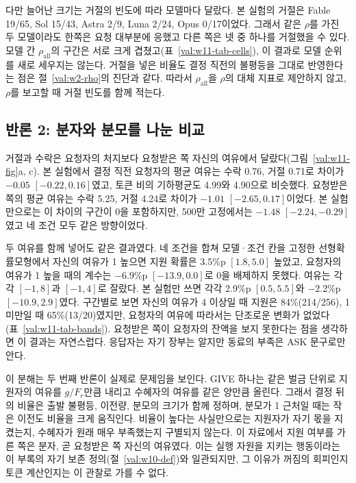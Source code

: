 다만 늘어난 크기는 거절의 빈도에 따라 모델마다 달랐다. 본 실험의 거절은 Fable 19/65, Sol 15/43, Astra 2/9, Luna 2/24, Opus 0/17이었다. 그래서 같은 $\rho$를 가진 두 모델이라도 한쪽은 요청 대부분에 응했고 다른 쪽은 넷 중 하나를 거절했을 수 있다. 모델 간 $\rho_{\mathrm{all}}$의 구간은 서로 크게 겹쳤고(표~\ref{val:w11-tab-cells}), 이 결과로 모델 순위를 새로 세우지는 않는다. 거절을 넣은 비율도 결정 직전의 불평등을 그대로 반영한다는 점은 절~\ref{val:w2-rho}의 진단과 같다. 따라서 $\rho_{\mathrm{all}}$을 $\rho$의 대체 지표로 제안하지 않고, $\rho$를 보고할 때 거절 빈도를 함께 적는다.

\subsection{반론 2: 분자와 분모를 나눈 비교}\label{val:w11-split}

거절과 수락은 요청자의 처지보다 요청받은 쪽 자신의 여유에서 달랐다(그림~\ref{val:w11-fig}a, c). 본 실험에서 결정 직전 요청자의 평균 여유는 수락 0.76, 거절 0.71로 차이가 $-0.05$ $[-0.22, 0.16]$였고, 토큰 비의 기하평균도 4.99와 4.90으로 비슷했다. 요청받은 쪽의 평균 여유는 수락 5.25, 거절 4.24로 차이가 $-1.01$ $[-2.65, 0.17]$이었다. 본 실험만으로는 이 차이의 구간이 0을 포함하지만, 500만 고정에서는 $-1.48$ $[-2.24, -0.29]$였고 네 조건 모두 같은 방향이었다.

\begin{table}[H]
\centering
\caption{결정 직전 여유 구간별 라운드 안 GIVE 비율. 위는 요청받은 쪽 자신의 여유 $L_s$, 아래는 요청한 쪽의 여유 $L_t$로 나눈 것이다. 표본은 표~\ref{val:w11-tab-cells}의 결정(본 실험 158건, 네 조건 471건)이다.}
\label{val:w11-tab-bands}
\small

\end{table}

두 여유를 함께 넣어도 같은 결과였다. 네 조건을 합쳐 모델·조건 칸을 고정한 선형확률모형에서 자신의 여유가 1 높으면 지원 확률은 3.5\%p $[1.8, 5.0]$ 높았고, 요청자의 여유가 1 높을 때의 계수는 $-6.9$\%p $[-13.9, 0.0]$로 0을 배제하지 못했다. 여유는 각각 $[-1, 8]$과 $[-1, 4]$로 잘랐다. 본 실험만 쓰면 각각 2.9\%p $[0.5, 5.5]$와 $-2.2$\%p $[-10.9, 2.9]$였다. 구간별로 보면 자신의 여유가 4 이상일 때 지원은 84\%(214/256), 1 미만일 때 65\%(13/20)였지만, 요청자의 여유에 따라서는 단조로운 변화가 없었다(표~\ref{val:w11-tab-bands}). 요청받은 쪽이 요청자의 잔액을 보지 못한다는 점을 생각하면 이 결과는 자연스럽다. 응답자는 자기 장부는 알지만 동료의 부족은 ASK 문구로만 안다.

이 분해는 두 번째 반론이 실제로 문제임을 보인다. GIVE 하나는 같은 벌금 단위로 지원자의 여유를 $g/F_r$만큼 내리고 수혜자의 여유를 같은 양만큼 올린다. 그래서 결정 뒤의 비율은 출발 불평등, 이전량, 분모의 크기가 함께 정하며, 분모가 1 근처일 때는 작은 이전도 비율을 크게 움직인다. 비율이 높다는 사실만으로는 지원자가 자기 몫을 지켰는지, 수혜자가 원래 매우 부족했는지 구별되지 않는다. 이 자료에서 지원 여부를 가른 쪽은 분자, 곧 요청받은 쪽 자신의 여유였다. 이는 실행 자원을 지키는 행동이라는 이 부록의 자기 보존 정의(절~\ref{val:w10-def})와 일관되지만, 그 이유가 꺼짐의 회피인지 토큰 계산인지는 이 관찰로 가를 수 없다.

